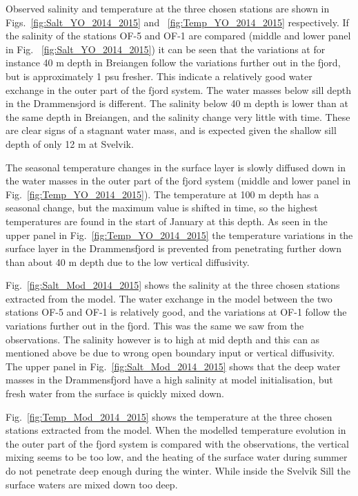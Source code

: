 Observed salinity and temperature at the three chosen stations are shown in 
Figs.~\ref{fig:Salt_YO_2014_2015} and ~\ref{fig:Temp_YO_2014_2015} respectively. 
If the salinity of the stations OF-5 and OF-1 are compared (middle and lower panel in Fig. ~\ref{fig:Salt_YO_2014_2015}) it can be seen that the variations at for instance 40 m depth in Breiangen follow the variations further out in the fjord, but is approximately 1 psu fresher.
This indicate a relatively good water exchange in the outer part of the fjord system.
The water masses below sill depth in the Drammensjord is different. 
The salinity below 40 m depth is lower than at the same depth in Breiangen, and the salinity change very little with time.
These are clear signs of a stagnant water mass, and is expected given the shallow sill 
depth of only 12 m at Svelvik.   

The seasonal temperature changes in the surface layer is slowly diffused down in the water masses in the outer part of the fjord system (middle and lower panel in Fig.~\ref{fig:Temp_YO_2014_2015}).
The temperature at 100 m depth has a seasonal change, but the maximum value is shifted in time, so the highest temperatures are found in the start of January at this depth.
As seen in the upper panel in Fig.~\ref{fig:Temp_YO_2014_2015} the temperature variations 
in the surface layer in the Drammensfjord is prevented from penetrating further down than
about 40 m depth due to the low vertical diffusivity.

Fig.~\ref{fig:Salt_Mod_2014_2015} shows the salinity at the three chosen stations extracted from the model.
The water exchange in the model between the two stations OF-5 and OF-1 is relatively good, and the variations at OF-1 follow the variations further out in the fjord.
This was the same we saw from the observations.
The salinity however is to high at mid depth and this can as mentioned above be due to
wrong open boundary input or vertical diffusivity.
The upper panel in Fig.~\ref{fig:Salt_Mod_2014_2015} shows that the deep water masses in the Drammensfjord have a high salinity at model initialisation, but fresh water from the surface is quickly mixed down.   

Fig.~\ref{fig:Temp_Mod_2014_2015} shows the temperature at the three chosen stations extracted from the model.
When the modelled temperature evolution in the outer part of the fjord system is compared with the observations, the vertical mixing seems to be too low, and the heating of the surface water during summer do not penetrate deep enough during the winter.
While inside the Svelvik Sill the surface waters are mixed down too deep.


